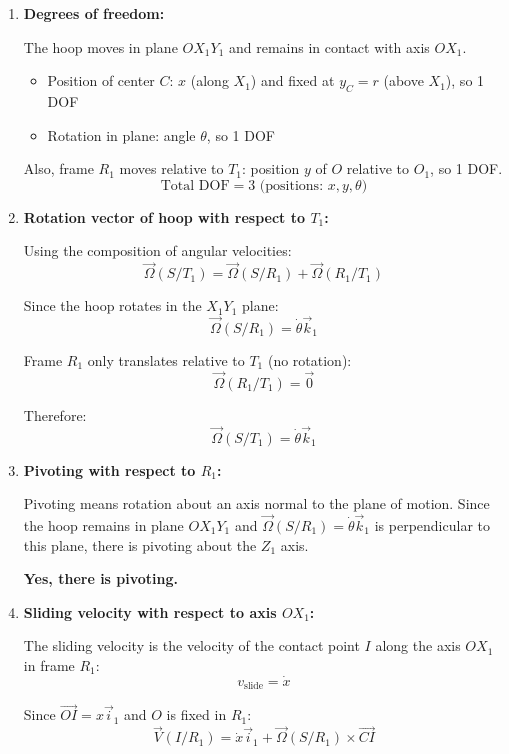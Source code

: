 \documentclass[12pt]{article}
\begin{document}
\begin{correctionbox}
\begin{enumerate}
    \item \textbf{Degrees of freedom:}
    
    The hoop moves in plane $OX_1Y_1$ and remains in contact with axis $OX_1$. 
    \begin{itemize}
        \item Position of center $C$: $x$ (along $X_1$) and fixed at $y_C = r$ (above $X_1$), so 1 DOF
        \item Rotation in plane: angle $\theta$, so 1 DOF
    \end{itemize}
    Also, frame $R_1$ moves relative to $T_1$: position $y$ of $O$ relative to $O_1$, so 1 DOF.
    $$\text{Total DOF} = 3 \text{ (positions: } x, y, \theta)$$
    
    \item \textbf{Rotation vector of hoop with respect to $T_1$:}
    
    Using the composition of angular velocities:
    $$\vec{\Omega}(S/T_1) = \vec{\Omega}(S/R_1) + \vec{\Omega}(R_1/T_1)$$
    
    Since the hoop rotates in the $X_1Y_1$ plane:
    $$\vec{\Omega}(S/R_1) = \dot{\theta} \vec{k}_1$$
    
    Frame $R_1$ only translates relative to $T_1$ (no rotation):
    $$\vec{\Omega}(R_1/T_1) = \vec{0}$$
    
    Therefore:
    $$\vec{\Omega}(S/T_1) = \dot{\theta} \vec{k}_1$$
    
    \item \textbf{Pivoting with respect to $R_1$:}
    
    Pivoting means rotation about an axis normal to the plane of motion. Since the hoop remains in plane $OX_1Y_1$ and $\vec{\Omega}(S/R_1) = \dot{\theta} \vec{k}_1$ is perpendicular to this plane, there is pivoting about the $Z_1$ axis.
    
    \textbf{Yes, there is pivoting.}
    
    \item \textbf{Sliding velocity with respect to axis $OX_1$:}
    
    The sliding velocity is the velocity of the contact point $I$ along the axis $OX_1$ in frame $R_1$:
    $$v_{\text{slide}} = \dot{x}$$
    
    Since $\overrightarrow{OI} = x\vec{i}_1$ and $O$ is fixed in $R_1$:
    $$\vec{V}(I/R_1) = \dot{x} \vec{i}_1 + \vec{\Omega}(S/R_1) \times \overrightarrow{CI}$$
    

\end{enumerate}
\end{correctionbox}
\end{document}
